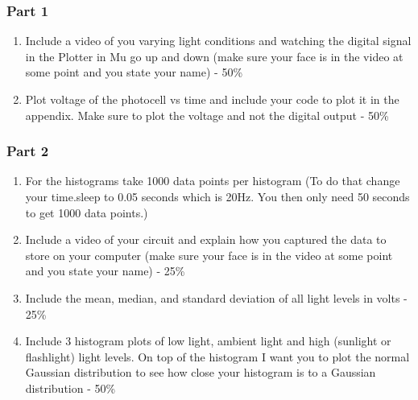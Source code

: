 
        
\subsubsection{Part 1}
\begin{enumerate}[itemsep=-5pt]
\item Include a video of you varying light conditions and watching the digital signal in the Plotter in Mu go up and down (make sure your face is in the video at some point and you state your name) - 50\%
\item Plot voltage of the photocell vs time and include your code to plot it in the appendix. Make sure to plot the
voltage and not the digital output - 50\%
\end{enumerate}

\subsubsection{Part 2}
\begin{enumerate}[itemsep=-5pt]
\item For the histograms take 1000 data points per histogram (To do
that change your time.sleep to 0.05 seconds which is 20Hz. You then
only need 50 seconds to get 1000 data points.)
\item Include a video of your circuit and explain how you captured the data to store on your computer (make sure your face is in the video at some point and you state your name) - 25\%
\item Include the mean, median, and standard deviation of all light levels in volts - 25\%
\item Include 3 histogram plots of low light, ambient light and high
(sunlight or flashlight) light levels. On top of the histogram I want you to plot the normal Gaussian distribution to see how close your histogram is to a Gaussian distribution  - 50\%
\end{enumerate}
